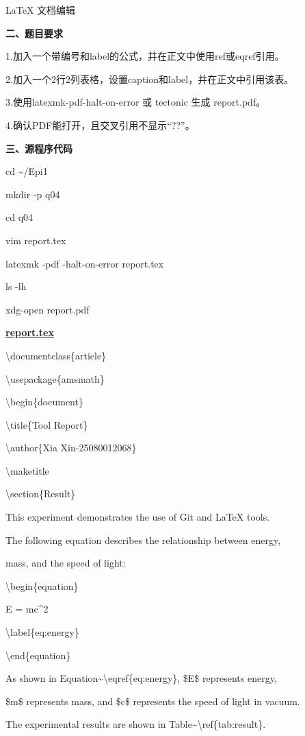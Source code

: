 \documentclass[12pt,a4paper]{article}
\newcommand{\ul}[1]{\underline{#1}}
\begin{document}
LaTeX 文档编辑

\vspace{0.6em}
\textbf{二、题目要求}

1.加入一个带编号和label的公式，并在正文中使用ref或eqref引用。

2.加入一个2行2列表格，设置caption和label，并在正文中引用该表。

3.使用latexmk-pdf-halt-on-error 或 tectonic 生成 report.pdf。

4.确认PDF能打开，且交叉引用不显示``??''。

\vspace{0.6em}
\textbf{三、源程序代码}

cd \textasciitilde/Epi1

mkdir -p q04

cd q04

vim report.tex

latexmk -pdf -halt-on-error report.tex

ls -lh

xdg-open report.pdf

\textbf{\ul{report.tex}}

\textbackslash documentclass\{article\}

\textbackslash usepackage\{amsmath\}

\textbackslash begin\{document\}

\textbackslash title\{Tool Report\}

\textbackslash author\{Xia Xin-25080012068\}

\textbackslash maketitle

\textbackslash section\{Result\}

This experiment demonstrates the use of Git and LaTeX tools.

The following equation describes the relationship between energy,

mass, and the speed of light:

\textbackslash begin\{equation\}

E = mc\^{}2

\textbackslash label\{eq:energy\}

\textbackslash end\{equation\}

As shown in Equation\textasciitilde\textbackslash eqref\{eq:energy\},
\$E\$ represents energy,

\$m\$ represents mass, and \$c\$ represents the speed of light in
vacuum.

The experimental results are shown in
Table\textasciitilde\textbackslash ref\{tab:result\}.
\end{document}
